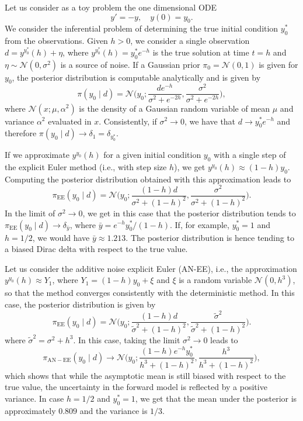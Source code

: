 \documentclass{siamart1116}
\title{{\TheTitle}}
\author{\empty}
\numberwithin{theorem}{section}
\begin{document}
\maketitle	

Let us consider as a toy problem the one dimensional ODE
\[
	y' = -y, \quad y(0) = y_0.
\]
We consider the inferential problem of determining the true initial condition $y_0^*$ from the observations. Given $h > 0$, we consider a single observation $d = y^{y_0^*}(h) + \eta$, where $y^{y_0^*}(h) = y_0^*e^{-h}$ is the true solution at time $t =  h$ and $\eta \sim \mathcal N (0, \sigma^2)$ is a source of noise. If a Gaussian prior $\pi_0 = \mathcal N(0, 1)$ is given for $y_0$, the posterior distribution is computable analytically and is given by
\[
	\pi(y_0 \mid d) = \mathcal N\Big(y_0; \frac{de^{-h}}{\sigma^2 + e^{-2h}}, \frac{\sigma^2}{\sigma^2 + e^{-2h}}\Big),
\]
where $\mathcal N(x; \mu, \alpha^2)$ is the density of a Gaussian random variable of mean $\mu$ and variance $\alpha^2$ evaluated in $x$. Consistently, if $\sigma^2 \to 0$, we have that $d \to y_0^*e^{-h}$ and therefore $\pi(y_0 \mid d) \to \delta_1 = \delta_{y_0^*}$. 

If we approximate $y^{y_0}(h)$ for a given initial condition $y_0$ with a single step of the explicit Euler method (i.e., with step size $h$), we get $y^{y_0}(h) \approx (1 - h)y_0$. Computing the posterior distribution obtained with this approximation leads to 
\[
	\pi_{\mathrm{EE}}(y_0 \mid d) = \mathcal N\Big(y_0; \frac{(1 - h)d}{\sigma^2 + (1- h)^2}, \frac{\sigma^2}{\sigma^2 + (1 - h)^2}\Big).
\]
In the limit of $\sigma^2 \to 0$, we get in this case that the posterior distribution tends to $\pi_{\mathrm{EE}}(y_0 \mid d) \to \delta_{\bar y}$, where $\bar y = e^{-h}y_0^* / (1 - h)$. If, for example, $y_0^* = 1$ and $h = 1/2$, we would have $\bar y \approx 1.213$.  The posterior distribution is hence tending to a biased Dirac delta with respect to the true value.

Let us consider the additive noise explicit Euler (AN-EE), i.e., the approximation $y^{y_0}(h) \approx Y_1$, where $Y_1 = (1 - h)y_0 + \xi$ and $\xi$ is a random variable $\mathcal N(0, h^3)$, so that the method converges consistently with the deterministic method. In this case, the posterior distribution is given by
\[
	\pi_{\mathrm{EE}}(y_0 \mid d) = \mathcal N\Big(y_0; \frac{(1 - h)d}{\tilde \sigma^2 + (1- h)^2}, \frac{\tilde \sigma^2}{\tilde \sigma^2 + (1 - h)^2}\Big).
\]
where $\tilde \sigma^2 = \sigma^2 + h^3$. In this case, taking the limit $\sigma^2 \to 0$ leads to 
\[
	\pi_{\mathrm{AN-EE}}(y_0 \mid d) \to \mathcal N\Big(y_0; \frac{(1 - h)e^{-h}y_0^*}{h^3 + (1 - h)^2}, \frac{h^3}{h^3 + (1 - h)^2}\Big),
\]
which shows that while the asymptotic mean is still biased with respect to the true value, the uncertainty in the forward model is reflected by a positive variance. In case $h=1/2$ and $y_0^* = 1$, we get that the mean under the posterior is approximately $0.809$ and the variance is $1/3$.
\end{document}

